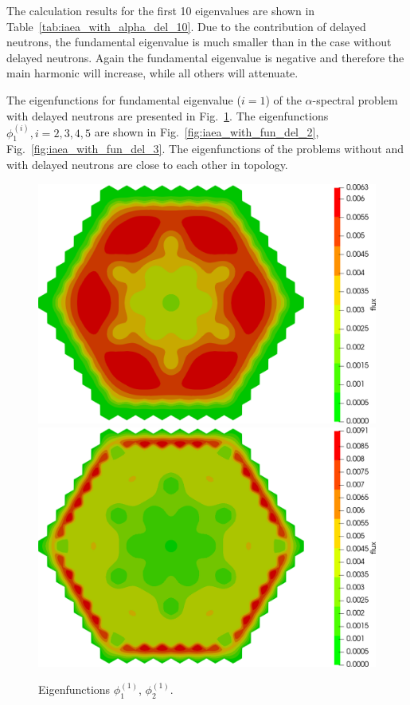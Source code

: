 \documentclass[authoryear]{elsarticle}
\begin{document}
The calculation results for the first 10 eigenvalues are shown in Table~\ref{tab:iaea_with_alpha_del_10}.
Due to the contribution of delayed neutrons, the fundamental eigenvalue is much smaller than in the case without delayed neutrons. Again the fundamental eigenvalue is negative and therefore the main harmonic will increase, while all others will attenuate.

The eigenfunctions for fundamental eigenvalue ($i=1$) of the $\alpha$-spectral problem with delayed neutrons are presented in Fig.~\ref{fig:iaea_with_fun_del_1}. 
The eigenfunctions $\phi_1^{(i)}, i=2,3,4,5$ are shown in Fig.~\ref{fig:iaea_with_fun_del_2}, Fig.~\ref{fig:iaea_with_fun_del_3}.
The eigenfunctions of the problems without and with delayed neutrons are close to each other in topology.

\begin{figure}[H]
\begin{center}
	\includegraphics[width=0.49\linewidth]{iaea_with/alpha_delayed_sp3_u1_1.png}
	\includegraphics[width=0.49\linewidth]{iaea_with/alpha_delayed_sp3_u2_1.png}\\
	\caption{Eigenfunctions $\phi_1^{(1)}$, $\phi_2^{(1)}$.}
	\label{fig:iaea_with_fun_del_1}
\end{center}
\end{figure}
\end{document}
